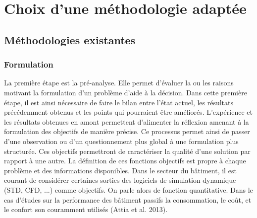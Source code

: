 

\section{Choix d’une méthodologie adaptée} %
\label{sec:choix_d_une_methodologie_adaptee}
\subsection{Méthodologies existantes} %
\label{sub:methodologies_existantes}
\subsubsection{Formulation} %
\label{ssub:formulation}


La première étape est la pré-analyse. Elle permet d’évaluer la ou les raisons
motivant la formulation d’un problème d’aide à la décision. Dans cette première étape,
il est ainsi nécessaire de faire le bilan entre l’état actuel, les résultats précédemment
obtenus et les points qui pourraient être améliorés.
L’expérience et les résultats obtenues en amont permettent d’alimenter
la réflexion amenant à la formulation des objectifs de manière précise.
Ce processus permet ainsi de passer d’une observation ou d’un questionnement plus global
à une formulation plus structurée.
Ces objectifs permettront de caractériser la qualité d’une solution par rapport à une autre.
La définition de ces fonctions objectifs est propre à chaque problème et des informations disponibles.
Dans le secteur du bâtiment, il est courant de considérer certaines sorties des
logiciels de simulation dynamique (STD, CFD, ...) comme objectifs. On parle alors
de fonction quantitative.
Dans le cas d’études sur la performance des bâtiment passifs la consommation, le coût,
et le confort son couramment utilisés (Attia et al. 2013).

